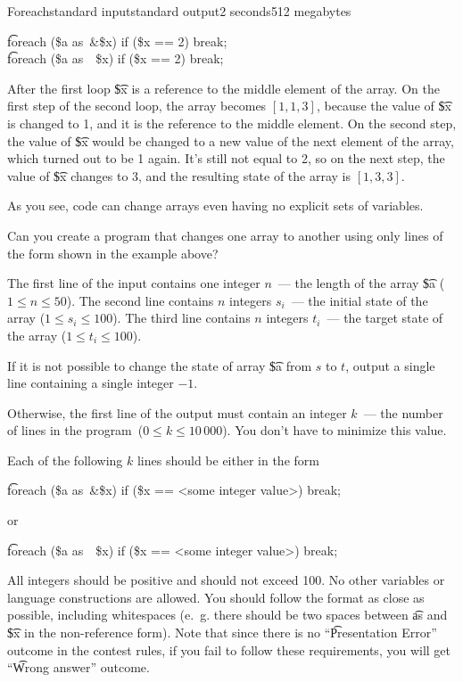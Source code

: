 \begin{problem}{Foreach}{standard input}{standard output}{2 seconds}{512 megabytes}
\begin{center}
\t{foreach (\$a as~\&\$x) if (\$x == 2) break;} \\
\t{foreach (\$a as~~\$x) if (\$x == 2) break;} \\
\end{center}

After the first loop \t{\$x} is a reference to the middle element of the array. On the first step of the second loop, the array becomes $[1, 1, 3]$, because the value of \t{\$x} is changed to 1, and it is the reference to the middle element. On the second step, the value of \t{\$x} would be changed to a new value of the next element of the array, which turned out to be 1 again. It's still not equal to 2, so on the next step, the value of \t{\$x} changes to 3, and the resulting state of the array is $[1, 3, 3]$.

As you see, code can change arrays even having no explicit sets of variables.

Can you create a program that changes one array to another using only lines of the form shown in the example above?

\InputFile
The first line of the input contains one integer $n$~--- the length of the array \t{\$a}  ($1 \le n \le 50$). 
The second line contains $n$ integers $s_i$~--- the initial state of the array ($1 \le s_i \le 100$). 
The third line contains $n$ integers $t_i$~--- the target state of the array  ($1 \le t_i \le 100$).

\OutputFile
If it is not possible to change the state of array \t{\$a} from $s$ to $t$, output a single line containing a single integer $-1$. 

Otherwise, the first line of the output must contain an integer $k$~--- the number of lines in the program~($0 \le k \le 10\,000$). You don't have to minimize this value.

Each of the following $k$ lines should be either in the form

\begin{center} 
\t{foreach (\$a as~\&\$x) if (\$x == <some integer value>) break;}
\end{center}

or 

\begin{center} 
\t{foreach (\$a as~~\$x) if (\$x == <some integer value>) break;}
\end{center}

All integers should be positive and should not exceed 100. No other variables or language constructions are allowed. You should follow the format as close as possible, including whitespaces (e.~g. there should be two spaces between \t{as} and \t{\$x} in the non-reference form). Note that since there is no ``\t{Presentation Error}'' outcome in the contest rules, if you fail to follow these requirements, you will get ``\t{Wrong answer}'' outcome.


\end{problem}
